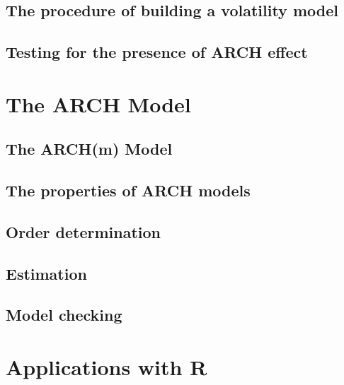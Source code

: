 \documentclass[a4paper,11pt]{article}
\begin{document}
\subsection{The procedure of building a volatility model}
\label{sec:orgb68b0ad}

\subsection{Testing for the presence of ARCH effect}
\label{sec:org2b05250}


\section{The ARCH Model}
\label{sec:orgee0d333}

\subsection{The ARCH(m) Model}
\label{sec:orgb4fe980}

\subsection{The properties of ARCH models}
\label{sec:org4772dd5}

\subsection{Order determination}
\label{sec:orgd985543}

\subsection{Estimation}
\label{sec:org06c71d0}

\subsection{Model checking}
\label{sec:orga281be8}


\section{Applications with R}
\label{sec:orga19da55}
\end{document}
